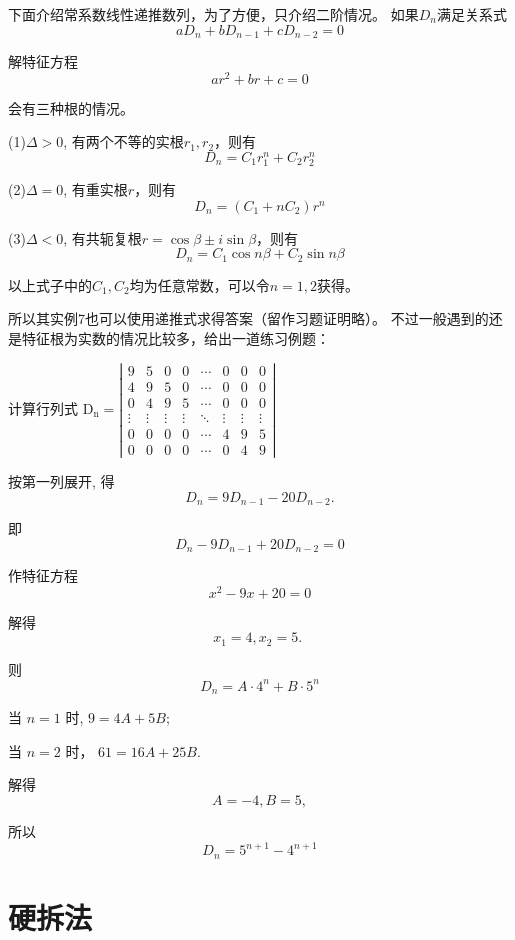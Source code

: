 下面介绍常系数线性递推数列，为了方便，只介绍二阶情况。
如果$D_n$满足关系式
$$
aD_n+bD_{n-1}+cD_{n-2}=0
$$

解特征方程
$$
ar^2+br+c=0
$$

会有三种根的情况。

(1)$\Delta>0$, 有两个不等的实根$r_1, r_2$，则有
$$
D_n=C_1r_1^n+C_2r_2^n
$$

(2)$\Delta=0$, 有重实根$r$，则有
$$
D_n=(C_1+nC_2)r^n
$$

(3)$\Delta<0$, 有共轭复根$r=\cos\beta\pm i\sin\beta$，则有
$$
D_n=C_1\cos n\beta + C_2\sin n\beta
$$

以上式子中的$C_1,C_2$均为任意常数，可以令$n=1,2$获得。

所以其实例7也可以使用递推式求得答案（留作习题证明略）。
不过一般遇到的还是特征根为实数的情况比较多，给出一道练习例题：

\begin{example}
    计算行列式 
$\mathrm{D}_{\mathrm{n}}=
\left|\begin{array}{cccccccc}
9 & 5 & 0 & 0 & \cdots & 0 & 0 & 0 \\
4 & 9 & 5 & 0 & \cdots & 0 & 0 & 0 \\
0 & 4 & 9 & 5 & \cdots & 0 & 0 & 0 \\
\vdots & \vdots & \vdots & \vdots & \ddots & \vdots & \vdots & \vdots \\
0 & 0 & 0 & 0 & \cdots & 4 & 9 & 5 \\
0 & 0 & 0 & 0 & \cdots & 0 & 4 & 9
\end{array}\right|$
\end{example}

\begin{solution}
    按第一列展开, 得
$$
D_{n}=9 D_{n-1}-20 D_{n-2} .
$$

即
$$
D_{n}-9 D_{n-1}+20 D_{n-2}=0
$$

作特征方程
$$
x^{2}-9 x+20=0
$$

解得
$$
x_{1}=4, x_{2}=5 \text {. }
$$

则
$$
D_{n}=A \cdot 4^n+B \cdot 5^n
$$

当 $n=1$ 时, $9=4A+5B$;

当 $n=2$ 时， $61=16A+25B$.

解得
$$
A=-4, B=5,
$$

所以
$$
D_n=5^{n+1}-4^{n+1}
$$
\end{solution}


\section{硬拆法}

